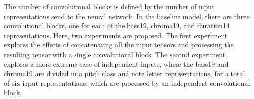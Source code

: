 
The number of convolutional blocks is defined by the number
of input representations send to the neural network. In the
baseline model, there are three convolutional blocks, one
for each of the \gls{bass19}, \gls{chroma19}, and
\gls{duration14} representations. Here, two experiments are
proposed. The first experiment explores the effects of
concatenating all the input tensors and processing the
resulting tensor with a single convolutional block. The
second experiment explores a more extreme case of
independent inputs, where the \gls{bass19} and \gls{chroma19} are divided into pitch class and note letter representations, for a total of six input representations, which are processed by an independent convolutional block.

